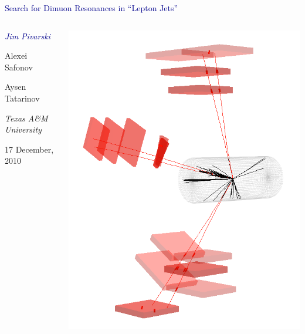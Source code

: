 \documentclass[compress]{beamer}
\begin{document}
\begin{frame}
\vfill
\begin{center}
\textcolor{darkblue}{\Large Search for Dimuon Resonances in ``Lepton Jets''}

\vfill
\begin{columns}
\begin{center}
\large
\textcolor{darkblue}{\it Jim Pivarski}

Alexei Safonov

Aysen Tatarinov

\vspace{0.5 cm}
\scriptsize
{\it Texas A\&M University}

\vspace{0.5 cm}
\normalsize
17 December, 2010
\end{center}

\includegraphics[width=\linewidth]{eventdisplay_3d.png}
\end{columns}

\end{center}
\end{frame}
\end{document}
